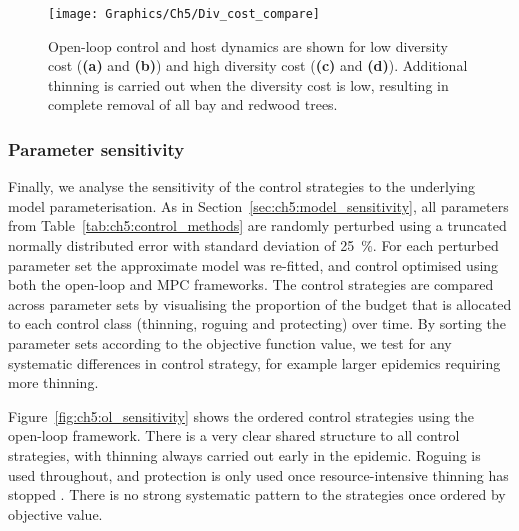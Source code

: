 \begin{figure}[t]
    \begin{center}
        \texttt{[image: Graphics/Ch5/Div\_cost\_compare]}
        \caption[Host dynamics when varying the diversity cost]{Open-loop control and host dynamics are shown for low diversity cost (\textbf{(a)} and \textbf{(b)}) and high diversity cost (\textbf{(c)} and \textbf{(d)}). Additional thinning is carried out when the diversity cost is low, resulting in complete removal of all bay and redwood trees. \label{fig:ch5:div_compare}}
    \end{center}
\end{figure}

\subsubsection{Parameter sensitivity}

Finally, we analyse the sensitivity of the control strategies to the underlying model parameterisation. As in Section~\ref{sec:ch5:model_sensitivity}, all parameters from Table~\ref{tab:ch5:control_methods} are randomly perturbed using a truncated normally distributed error with standard deviation of \SI{25}{\percent}. For each perturbed parameter set the approximate model was re-fitted, and control optimised using both the open-loop and MPC frameworks. The control strategies are compared across parameter sets by visualising the proportion of the budget that is allocated to each control class (thinning, roguing and protecting) over time. By sorting the parameter sets according to the objective function value, we test for any systematic differences in control strategy, for example larger epidemics requiring more thinning.

Figure~\ref{fig:ch5:ol_sensitivity} shows the ordered control strategies using the open-loop framework. There is a very clear shared structure to all control strategies, with thinning always carried out early in the epidemic. Roguing is used throughout, and protection is only used once resource-intensive thinning has stopped . There is no strong systematic pattern to the strategies once ordered by objective value.

